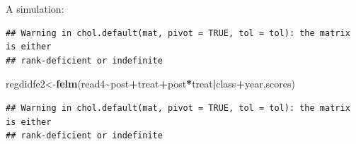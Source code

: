 \documentclass[
  ignorenonframetext,
]{beamer}
\newenvironment{Shaded}{\begin{snugshade}}{\end{snugshade}}
\newcommand{\DecValTok}[1]{\textcolor[rgb]{0.00,0.00,0.81}{#1}}
\newcommand{\FunctionTok}[1]{\textcolor[rgb]{0.13,0.29,0.53}{\textbf{#1}}}
\newcommand{\NormalTok}[1]{#1}
\newcommand{\OtherTok}[1]{\textcolor[rgb]{0.56,0.35,0.01}{#1}}
\newcommand{\SpecialCharTok}[1]{\textcolor[rgb]{0.81,0.36,0.00}{\textbf{#1}}}
\newcommand{\StringTok}[1]{\textcolor[rgb]{0.31,0.60,0.02}{#1}}
\begin{document}
\begin{frame}[fragile]{A simulation:}
\protect\hypertarget{a-simulation-3}{}
\tiny

\begin{Shaded}
\end{Shaded}

\begin{verbatim}
## Warning in chol.default(mat, pivot = TRUE, tol = tol): the matrix is either
## rank-deficient or indefinite
\end{verbatim}

\begin{Shaded}
\begin{Highlighting}[]
\NormalTok{regdidfe2}\OtherTok{\textless{}{-}}\FunctionTok{felm}\NormalTok{(read4}\SpecialCharTok{\textasciitilde{}}\NormalTok{post}\SpecialCharTok{+}\NormalTok{treat}\SpecialCharTok{+}\NormalTok{post}\SpecialCharTok{*}\NormalTok{treat}\SpecialCharTok{|}\NormalTok{class}\SpecialCharTok{+}\NormalTok{year,scores)}
\end{Highlighting}
\end{Shaded}

\begin{verbatim}
## Warning in chol.default(mat, pivot = TRUE, tol = tol): the matrix is either
## rank-deficient or indefinite
\end{verbatim}
\end{frame}
\end{document}

